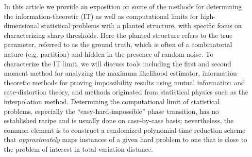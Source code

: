 



In this article we provide an exposition on some of the methods for determining the information-theoretic (IT) as well as computational limits for high-dimensional statistical problems with a planted structure, with specific focus on characterizing sharp thresholds. 
Here the planted structure refers to the true parameter, referred to as the ground truth, which is often of a combinatorial nature (e.g. partition) and hidden in the presence of random noise. To characterize the IT limit, we will discuss tools including the first and second moment method for analyzing the maximum likelihood estimator, information-theoretic methods for proving impossibility results using  mutual information and rate-distortion theory, and methods originated from statistical physics such as the interpolation method.
Determining the computational limit of statistical problems, especially the ``easy-hard-impossible'' phase transition, has no established recipe and is usually done on case-by-case basis; nevertheless, the common element is to construct a randomized polynomial-time reduction scheme that \emph{approximately} maps instances of a given hard problem to one that is close to the problem of interest in total variation distance.


